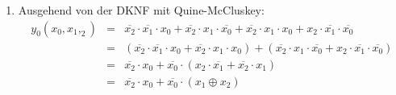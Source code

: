 \documentclass[DIN, pagenumber=false, fontsize=11pt, parskip=half]{scrartcl}
\begin{document}
\begin{enumerate}[label=(\alph*)]
        \item 
            Ausgehend von der DKNF mit Quine-McCluskey:
            \begin{eqnarray*}
                y_0(x_0, x_1, _2) &=& 
                \overline{x_2} \cdot \overline{x_1} \cdot x_0 + 
                \overline{x_2} \cdot x_1 \cdot \overline{x_0} +
                \overline{x_2} \cdot x_1 \cdot x_0 +
                x_2 \cdot \overline{x_1} \cdot \overline{x_0} \\
                &=& (\overline{x_2} \cdot \overline{x_1} \cdot x_0 + 
                \overline{x_2} \cdot x_1 \cdot x_0) +
                (\overline{x_2} \cdot x_1 \cdot \overline{x_0} +
                x_2 \cdot \overline{x_1} \cdot \overline{x_0}) \\
                &=& \overline{x_2} \cdot x_0 +
                \overline{x_0} \cdot (x_2 \cdot \overline{x_1} + \overline{x_2} \cdot x_1) \\
                &=& \overline{x_2} \cdot x_0 + \overline{x_0} \cdot (x_1 \oplus x_2)
            \end{eqnarray*}
    \end{enumerate}
\end{document}
